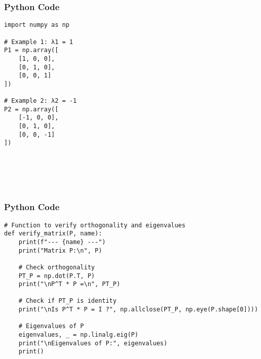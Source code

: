 \documentclass{beamer}
\begin{document}
\begin{frame}[fragile]
    \frametitle{Python Code}
    \begin{lstlisting}
import numpy as np

# Example 1: λ1 = 1
P1 = np.array([
    [1, 0, 0],
    [0, 1, 0],
    [0, 0, 1]
])

# Example 2: λ2 = -1
P2 = np.array([
    [-1, 0, 0],
    [0, 1, 0],
    [0, 0, -1]
])






    \end{lstlisting}
\end{frame}
\begin{frame}[fragile]
    \frametitle{Python Code}
    \begin{lstlisting}
# Function to verify orthogonality and eigenvalues
def verify_matrix(P, name):
    print(f"--- {name} ---")
    print("Matrix P:\n", P)

    # Check orthogonality
    PT_P = np.dot(P.T, P)
    print("\nP^T * P =\n", PT_P)

    # Check if PT_P is identity
    print("\nIs P^T * P = I ?", np.allclose(PT_P, np.eye(P.shape[0])))

    # Eigenvalues of P
    eigenvalues, _ = np.linalg.eig(P)
    print("\nEigenvalues of P:", eigenvalues)
    print()



    \end{lstlisting}
\end{frame}
\end{document}
